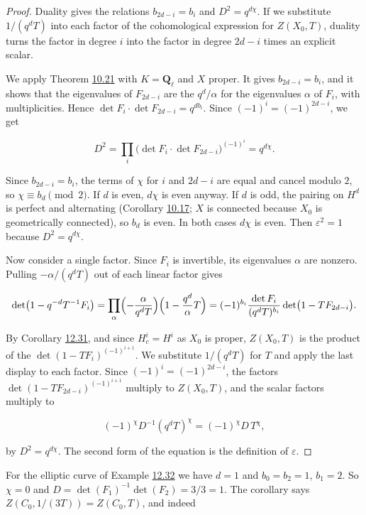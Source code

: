 \documentclass[11pt]{article}
\begin{document}
\begin{proof}[{Proof}]\label{bp326}%
Duality gives the relations \(b_{2d-i}=b_i\) and \(D^2=q^{d\chi}\). If we substitute \(1/(q^dT)\) into each factor of the cohomological expression for \(Z(X_0,T)\), duality turns the factor in degree \(i\) into the factor in degree \(2d-i\) times an explicit scalar.

We apply Theorem \hyperref[bp165]{10.21} with \(K=\mathbf Q_\ell\) and \(X\) proper. It gives \(b_{2d-i}=b_i\), and it shows that the eigenvalues of \(F_{2d-i}\) are the \(q^d/\alpha\) for the eigenvalues \(\alpha\) of \(F_i\), with multiplicities. Hence \(\det F_i\cdot\det F_{2d-i}=q^{db_i}\). Since \((-1)^i=(-1)^{2d-i}\), we get

\[
D^2=\prod_i\bigl(\det F_i\cdot\det F_{2d-i}\bigr)^{(-1)^i}
=q^{d\chi}.
\]

Since \(b_{2d-i}=b_i\), the terms of \(\chi\) for \(i\) and \(2d-i\) are equal and cancel modulo \(2\), so \(\chi\equiv b_d\pmod 2\). If \(d\) is even, \(d\chi\) is even anyway. If \(d\) is odd, the pairing on \(H^d\) is perfect and alternating (Corollary \hyperref[bp152]{10.17}; \(X\) is connected because \(X_0\) is geometrically connected), so \(b_d\) is even. In both cases \(d\chi\) is even. Then \(\varepsilon^2=1\) because \(D^2=q^{d\chi}\).

Now consider a single factor. Since \(F_i\) is invertible, its eigenvalues \(\alpha\) are nonzero. Pulling \(-\alpha/(q^dT)\) out of each linear factor gives

\[
\det\bigl(1-q^{-d}T^{-1}F_i\bigr)
=\prod_\alpha\Bigl(-\frac{\alpha}{q^dT}\Bigr)\Bigl(1-\frac{q^d}{\alpha}T\Bigr)
=(-1)^{b_i}\frac{\det F_i}{(q^dT)^{b_i}}\det\bigl(1-TF_{2d-i}\bigr).
\]

By Corollary \hyperref[bp320]{12.31}, and since \(H^i_c=H^i\) as \(X_0\) is proper, \(Z(X_0,T)\) is the product of the \(\det(1-TF_i)^{(-1)^{i+1}}\). We substitute \(1/(q^dT)\) for \(T\) and apply the last display to each factor. Since \((-1)^i=(-1)^{2d-i}\), the factors \(\det(1-TF_{2d-i})^{(-1)^{i+1}}\) multiply to \(Z(X_0,T)\), and the scalar factors multiply to

\[
(-1)^{\chi}D^{-1}(q^dT)^{\chi}=(-1)^{\chi}D\,T^{\chi},
\]

by \(D^2=q^{d\chi}\). The second form of the equation is the definition of \(\varepsilon\).
\end{proof}

\label{bp327}%
For the elliptic curve of Example \hyperref[bp323]{12.32} we have \(d=1\) and \(b_0=b_2=1\), \(b_1=2\). So \(\chi=0\) and \(D=\det(F_1)^{-1}\det(F_2)=3/3=1\). The corollary says \(Z(C_0,1/(3T))=Z(C_0,T)\), and indeed
\end{document}

